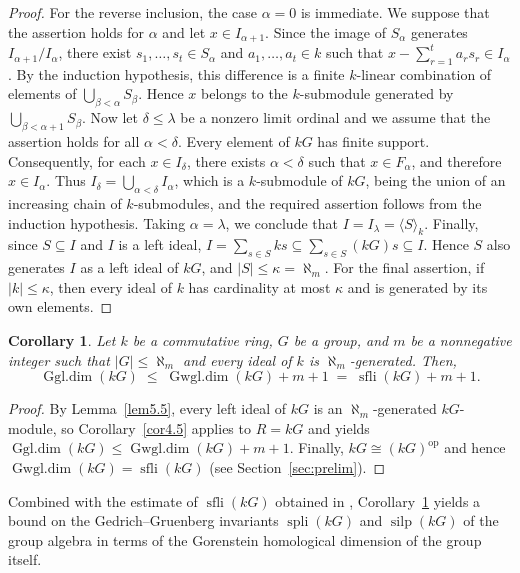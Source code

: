 \documentclass[12pt]{amsart}
\newtheorem{corollary}[theorem]{Corollary}
\theoremstyle{remark}
\theoremstyle{definition}
\theoremstyle{plain}
\DeclareMathOperator{\sfli}{sfli}
\DeclareMathOperator{\spli}{spli}
\DeclareMathOperator{\silp}{silp}
\DeclareMathOperator{\Gwgl}{Gwgl.dim}
\DeclareMathOperator{\Ggl}{Ggl.dim}
\newcommand{\alephm}{\aleph_m}
\begin{document}
\begin{proof}
For the reverse inclusion, the case $\alpha=0$ is immediate. We suppose that the assertion holds for $\alpha$
and let $x\in I_{\alpha+1}$.
Since the image of $S_\alpha$ generates
$I_{\alpha+1}/I_\alpha$, there exist
$s_1,\ldots,s_t\in S_\alpha$ and
$a_1,\ldots,a_t\in k$ such that $x-\sum_{r=1}^{t}a_rs_r\in I_\alpha$.
By the induction hypothesis, this difference is a finite
$k$-linear combination of elements of
$\bigcup_{\beta<\alpha}S_\beta$.
Hence $x$ belongs to the $k$-submodule generated by
$\bigcup_{\beta<\alpha+1}S_\beta$. Now let $\delta\leq\lambda$ be a nonzero limit ordinal and we assume that the assertion holds for all
$\alpha<\delta$. Every element of $kG$ has finite support. Consequently, for each $x\in I_\delta$, there exists $\alpha<\delta$ such that $x\in F_\alpha$, and therefore $x\in I_\alpha$.
Thus $I_\delta=\bigcup_{\alpha<\delta}I_\alpha$, which is a $k$-submodule of $kG$, being the union of an increasing chain of $k$-submodules, and the required assertion follows from the induction
hypothesis. Taking $\alpha=\lambda$, we conclude that
$I=I_\lambda=\langle S\rangle_k$. Finally, since $S\subseteq I$ and $I$ is a left ideal, $I=\sum_{s\in S}ks
\subseteq\sum_{s\in S}(kG)s
\subseteq I$.
Hence $S$ also generates $I$ as a left ideal of $kG$,
and $|S|\leq\kappa=\aleph_m$. For the final assertion, if $|k|\leq\kappa$, then every ideal of $k$ has cardinality at most $\kappa$ and is generated by its own elements.
\end{proof}

\begin{corollary}\label{cor5.6}
Let $k$ be a commutative ring, $G$ be a group, and $m$ be a nonnegative integer such that $|G|\le\alephm$ and every ideal of $k$ is $\alephm$-generated. Then,
\[
\Ggl(kG)\;\le\;\Gwgl(kG)+m+1\;=\;\sfli(kG)+m+1 .
\]
\end{corollary}

\begin{proof} By Lemma~\ref{lem5.5}, every left ideal of $kG$ is an $\alephm$-generated $kG$-module, so Corollary~\ref{cor4.5} applies to $R=kG$ and yields $\Ggl(kG)\le\Gwgl(kG)+m+1$. Finally, $kG\cong(kG)^{\mathrm{op}}$ and hence $\Gwgl(kG)=\sfli(kG)$ (see Section~\ref{sec:prelim}).
\end{proof}

Combined with the estimate of $\sfli(kG)$ obtained in \cite{KS}, Corollary~\ref{cor5.6} yields a bound on the Gedrich--Gruenberg invariants $\spli(kG)$ and $\silp(kG)$ of the group algebra in terms of the Gorenstein homological dimension of the group itself.
\end{document}
